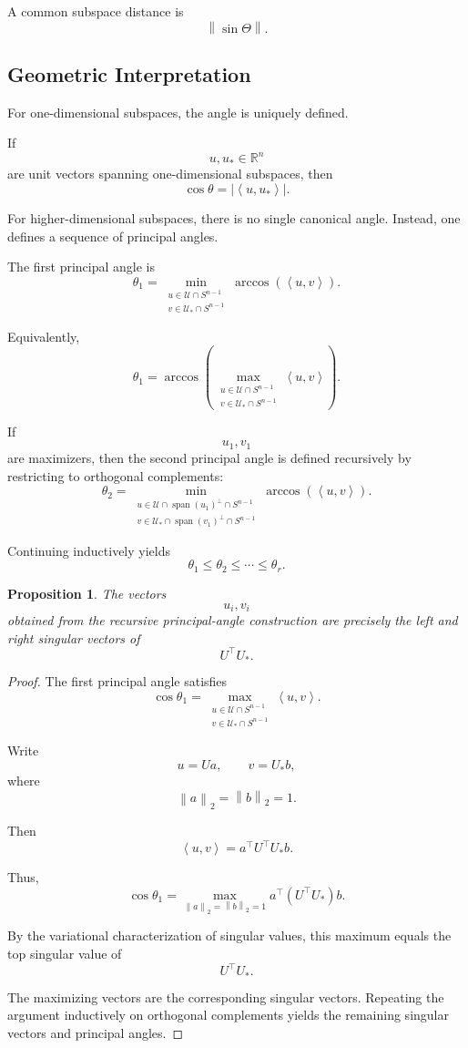 \documentclass[12pt,oneside]{book}
\numberwithin{equation}{section}
\theoremstyle{definition}
\theoremstyle{plain}
\newtheorem{proposition}{Proposition}[section]
\theoremstyle{remark}
\newcommand{\R}{\mathbb{R}}
\newcommand{\norm}[1]{\left\lVert #1 \right\rVert}
\newcommand{\inner}[2]{\left\langle #1, #2 \right\rangle}
\begin{document}
A common subspace distance is
\[
\norm{\sin\Theta}.
\]

\subsection{Geometric Interpretation}

For one-dimensional subspaces, the angle is uniquely defined.

If
\[
u,u_*\in\R^n
\]
are unit vectors spanning one-dimensional subspaces, then
\[
\cos\theta
=
|\inner{u}{u_*}|.
\]

For higher-dimensional subspaces, there is no single canonical angle. Instead, one defines a sequence of principal angles.

The first principal angle is
\[
\theta_1
=
\min_{\substack{
u\in \mathcal{U}\cap S^{n-1}\\
v\in \mathcal{U}_*\cap S^{n-1}
}}
\arccos(\inner{u}{v}).
\]

Equivalently,
\[
\theta_1
=
\arccos
\left(
\max_{\substack{
u\in \mathcal{U}\cap S^{n-1}\\
v\in \mathcal{U}_*\cap S^{n-1}
}}
\inner{u}{v}
\right).
\]

If
\[
u_1,v_1
\]
are maximizers, then the second principal angle is defined recursively by restricting to orthogonal complements:
\[
\theta_2
=
\min_{\substack{
u\in \mathcal{U}\cap \operatorname{span}(u_1)^\perp\cap S^{n-1}\\
v\in \mathcal{U}_*\cap \operatorname{span}(v_1)^\perp\cap S^{n-1}
}}
\arccos(\inner{u}{v}).
\]

Continuing inductively yields
\[
\theta_1\leq \theta_2\leq \cdots \leq \theta_r.
\]

\begin{proposition}
The vectors
\[
u_i,v_i
\]
obtained from the recursive principal-angle construction are precisely the left and right singular vectors of
\[
U^\top U_*.
\]
\end{proposition}

\begin{proof}
The first principal angle satisfies
\[
\cos\theta_1
=
\max_{\substack{
u\in\mathcal{U}\cap S^{n-1}\\
v\in\mathcal{U}_*\cap S^{n-1}
}}
\inner{u}{v}.
\]

Write
\[
u=Ua,
\qquad
v=U_*b,
\]
where
\[
\norm{a}_2=\norm{b}_2=1.
\]

Then
\[
\inner{u}{v}
=
a^\top U^\top U_* b.
\]

Thus,
\[
\cos\theta_1
=
\max_{\norm{a}_2=\norm{b}_2=1}
a^\top(U^\top U_*)b.
\]

By the variational characterization of singular values, this maximum equals the top singular value of
\[
U^\top U_*.
\]

The maximizing vectors are the corresponding singular vectors. Repeating the argument inductively on orthogonal complements yields the remaining singular vectors and principal angles.
\end{proof}
\end{document}
